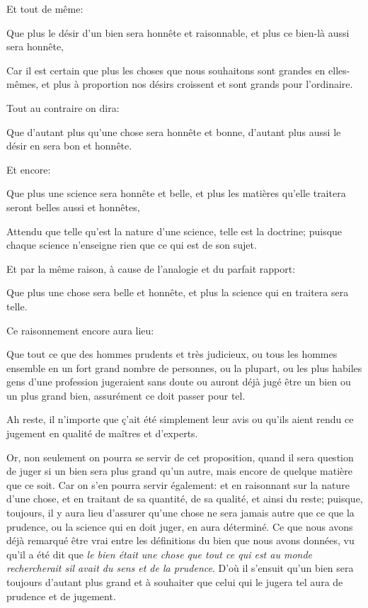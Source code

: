 Et tout de même:

\begin{emphpar}
    Que plus le désir d'un bien sera honnête et raisonnable, et plus ce bien-là aussi sera honnête,
\end{emphpar}

Car il est certain que plus les choses que nous souhaitons sont grandes en elles-mêmes, et plus à proportion nos désirs
croissent et sont grands pour l'ordinaire.

\bigbreak

Tout au contraire on dira:

\begin{emphpar}
    Que d'autant plus qu'une chose sera honnête et bonne, d'autant plus aussi le désir en sera bon et honnête.
\end{emphpar}

Et encore:

\begin{emphpar}
    Que plus une science sera honnête et belle, et plus les matières qu'elle traitera seront belles aussi et honnêtes,
\end{emphpar}

Attendu que telle qu'est la nature d'une science, telle est la doctrine; puisque chaque science n'enseigne rien que ce qui
est de son sujet.

Et par la même raison, à cause de l'analogie et du parfait rapport:

\begin{emphpar}
    Que plus une chose sera belle et honnête, et plus la science qui en traitera sera telle.
\end{emphpar}

\bigbreak

Ce raisonnement encore aura lieu:

\begin{emphpar}
    Que tout ce que des hommes prudents et très judicieux, ou tous les hommes ensemble en un fort grand nombre de personnes,
	ou la plupart, ou les plus habiles gens d'une profession jugeraient sans doute ou auront déjà jugé être un bien ou un plus
	grand bien, assurément ce doit passer pour tel.
\end{emphpar}

Ah reste, il n'importe que ç'ait été simplement leur avis ou qu'ils aient rendu ce jugement en qualité de maîtres et d'experts.

Or, non seulement on pourra se servir de cet proposition, quand il sera question de juger si un bien sera plus grand qu'un autre,
mais encore de quelque matière que ce soit. Car on s'en pourra servir également: et en raisonnant sur la nature d'une chose, et en
traitant de sa quantité, de sa qualité, et ainsi du reste; puisque, toujours, il y aura lieu d’assurer qu'une chose ne sera jamais
autre que ce que la prudence, ou la science qui en doit juger, en aura déterminé. Ce que nous avons déjà remarqué être vrai entre
les définitions du bien que nous avons données, vu qu'il a été dit que \emph{le bien était une chose que tout ce qui est au monde
rechercherait sil avait du sens et de la prudence}. D'où il s'ensuit qu'un bien sera toujours d'autant plus grand et à souhaiter
que celui qui le jugera tel aura de prudence et de jugement.

